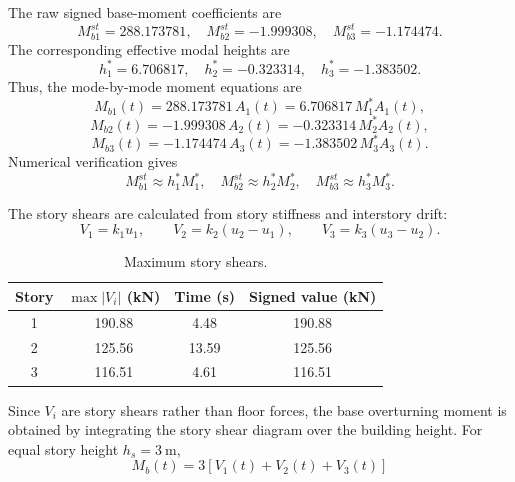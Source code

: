 \documentclass[11pt,a4paper]{article}
\begin{document}
The raw signed base-moment coefficients are
\begin{equation}
M_{b1}^{st}=288.173781,\quad M_{b2}^{st}=-1.999308,\quad M_{b3}^{st}=-1.174474.
\end{equation}
The corresponding effective modal heights are
\begin{equation}
h_1^*=6.706817,\quad h_2^*=-0.323314,\quad h_3^*=-1.383502.
\end{equation}
Thus, the mode-by-mode moment equations are
\begin{equation}
M_{b1}(t)=288.173781\,A_1(t)=6.706817\,M_1^*A_1(t),
\end{equation}
\begin{equation}
M_{b2}(t)=-1.999308\,A_2(t)=-0.323314\,M_2^*A_2(t),
\end{equation}
\begin{equation}
M_{b3}(t)=-1.174474\,A_3(t)=-1.383502\,M_3^*A_3(t).
\end{equation}
Numerical verification gives
\begin{equation}
M_{b1}^{st}\approx h_1^*M_1^*,\quad M_{b2}^{st}\approx h_2^*M_2^*,\quad M_{b3}^{st}\approx h_3^*M_3^*.
\end{equation}

The story shears are calculated from story stiffness and interstory drift:
\begin{equation}
V_1=k_1u_1,
\qquad
V_2=k_2(u_2-u_1),
\qquad
V_3=k_3(u_3-u_2).
\end{equation}

\begin{table}[H]
\centering
\caption{Maximum story shears.}
\begin{tabular}{cccc}
\toprule
Story & $\max|V_i|$ (kN) & Time (s) & Signed value (kN)\\
\midrule
1 & 190.88 & 4.48 & 190.88\\
2 & 125.56 & 13.59 & 125.56\\
3 & 116.51 & 4.61 & 116.51\\
\bottomrule
\end{tabular}
\label{tab:q3_story_shears}
\end{table}

Since $V_i$ are story shears rather than floor forces, the base overturning moment is obtained by integrating the story shear diagram over the building height. For equal story height $h_s=3\ \mathrm{m}$,
\begin{equation}
\boxed{
M_b(t)=3\left[V_1(t)+V_2(t)+V_3(t)\right]
}
\end{equation}
\end{document}
